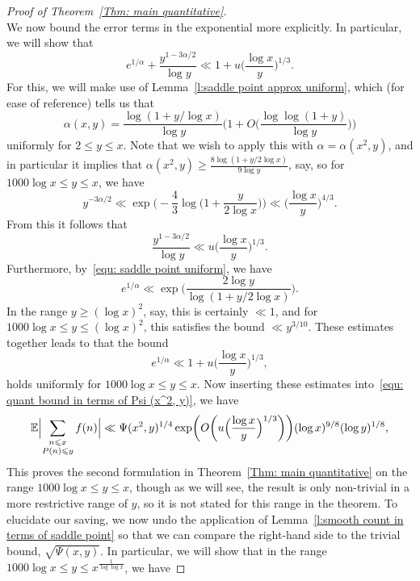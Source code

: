 \documentclass[12pt,a4paper,reqno]{amsart}
\numberwithin{equation}{section}
\def\E{\mathbb E}
\def\leq {\leqslant}
\theoremstyle{remark}
\theoremstyle{definition}
\numberwithin{equation}{section}
\theoremstyle{remark}
\def\E{\mathbb E}
\begin{document}
\begin{proof}[Proof of Theorem~\ref{Thm: main quantitative}]
\begin{equation}
\end{equation}
We now bound the error terms in the exponential more explicitly. In particular, we will show that
\[
e^{1/\alpha} + \frac{y^{1 - 3 \alpha / 2}}{\log y} \ll 1 + u \biggl( \frac{\log x}{y} \biggr)^{1/3}. 
\]
For this, we will make use of Lemma~\ref{l:saddle point approx uniform}, which (for ease of reference) tells us that
\begin{equation}\label{equ: saddle point uniform}
\alpha (x,y) = \frac{\log (1 + y/\log x)}{\log y} \biggl( 1 + O \biggl( \frac{\log \log (1+y)}{\log y} \biggr) \biggr)
\end{equation}
uniformly for $2 \leq y \leq x$. Note that we wish to apply this with $\alpha = \alpha(x^2,y)$, and in particular it implies that $\alpha (x^2, y) \geq \frac{8 \log (1 + y / 2 \log x)}{9 \log y}$, say, so for $1000 \log x \leq y \leq x$, we have
\[
y^{-3\alpha / 2} \ll \exp \biggl( - \frac{4}{3} \log \biggl(1 + \frac{y}{2\log x}\biggr) \biggr) \ll \biggl( \frac{\log x}{y} \biggr)^{4/3}.
\]
From this it follows that
\[
\frac{y^{1 - 3 \alpha / 2}}{\log y} \ll u \biggl( \frac{\log x}{y} \biggr)^{1/3}.
\]
Furthermore, by~\eqref{equ: saddle point uniform}, we have
\[
e^{1/\alpha} \ll \exp \biggl( \frac{2 \log y}{\log (1 + y/2\log x)} \biggr).
\]
In the range $y \geq (\log x)^2$, say, this is certainly $\ll 1$, and for $1000 \log x \leq y \leq (\log x)^2$, this satisfies the bound $\ll y^{3/10}$. These estimates together leads to that the bound
\[
e^{1/\alpha} \ll 1 +  u \biggl( \frac{\log x}{y} \biggr)^{1/3},
\]
holds uniformly for $1000 \log x \leq y \leq x$. Now inserting these estimates into~\eqref{equ: quant bound in terms of Psi (x^2, y)}, we have 
\begin{equation}\label{equ: L1 norm in terms of psi(x^2, y) bound}
\E \Bigl| \sum_{\substack{n \leq x \\ P(n) \leq y}} f(n) \Bigr| \ll \Psi(x^2, y)^{1/4} \exp \biggl( O \biggl( u \Bigl( \frac{\log x}{y} \Bigr)^{1/3} \biggr) \biggr) (\log x)^{9/8} (\log y)^{1/8},
\end{equation}
This proves the second formulation in Theorem~\ref{Thm: main quantitative} on the range $1000 \log x \leq y \leq x$, though as we will see, the result is only non-trivial in a more restrictive range of $y$, so it is not stated for this range in the theorem. To elucidate our saving, we now undo the application of Lemma~\ref{l:smooth count in terms of saddle point} so that we can compare the right-hand side to the trivial bound, $\sqrt{\Psi(x,y)}$. In particular, we will show that in the range $1000 \log x \leq y \leq x^{\frac{1}{\log \log x}}$, we have

\end{proof}
\end{document}
